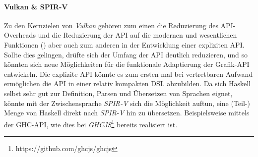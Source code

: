 \paragraph{Vulkan \& SPIR-V} Zu den Kernzielen von \textit{Vulkan} gehören zum einen die Reduzierung des \acs{API}-Overheads und die Reduzierung der \ac{API} auf die modernen und wesentlichen Funktionen () aber auch zum anderen in der Entwicklung einer expliziten \acs{API}. Sollte dies gelingen, drüfte sich der Umfang der \acs{API} deutlich reduzieren, und so könnten sich neue Möglichkeiten für die funktionale Adaptierung der Grafik-\acs{API} entwickeln. Die explizite \ac{API} könnte es zum ersten mal bei vertretbaren Aufwand ermöglichen die \ac{API} in einer relativ kompakten \ac{DSL} abzubilden. Da sich Haskell selbst sehr gut zur Definition, Parsen und Übersetzen von Sprachen eignet, könnte mit der Zwischensprache \textit{SPIR-V} sich die Möglichkeit auftun, eine (Teil-) Menge von Haskell direkt nach \textit{SPIR-V} hin zu übersetzen. Beispielsweise mittels der \acf{GHC}-\acs{API}, wie dies bei \textit{GHCJS}\footnote{https://github.com/ghcjs/ghcjs} bereits realisiert ist.
